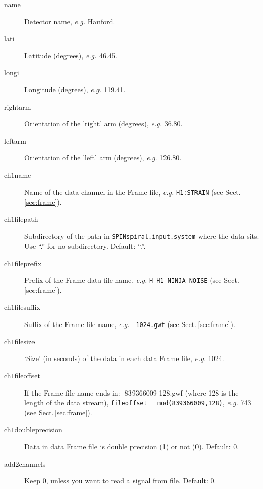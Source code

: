 \begin{description}
\item[name] Detector name, \textit{e.g.} Hanford.
\item[lati] Latitude (degrees), \textit{e.g.} 46.45.
\item[longi] Longitude (degrees), \textit{e.g.} 119.41.
\item[rightarm] Orientation of the 'right' arm (degrees), \textit{e.g.} 36.80.
\item[leftarm] Orientation of the 'left' arm (degrees), \textit{e.g.} 126.80.
                                                                                                                                                                                                               
\item[ch$1$name] Name of the data channel in the Frame file, \textit{e.g.} \texttt{H1:STRAIN} (see Sect.\,\ref{sec:frame}).
\item[ch$1$filepath] Subdirectory of the path in \texttt{SPINspiral.input.system} where the data sits.  Use ``.'' for no subdirectory.  Default: ``.''.
\item[ch$1$fileprefix] Prefix of the Frame data file name, \textit{e.g.} \texttt{H-H1\_NINJA\_NOISE} (see Sect.\,\ref{sec:frame}).
\item[ch$1$filesuffix] Suffix of the Frame file name, \textit{e.g.} \texttt{-1024.gwf} (see Sect.\,\ref{sec:frame}).
\item[ch$1$filesize] `Size' (in seconds) of the data in each data Frame file, \textit{e.g.} 1024.
\item[ch$1$fileoffset] If the Frame file name ends in: -839366009-128.gwf (where 128 is the length of the data stream), \texttt{fileoffset} = \texttt{mod(839366009,128)}, \textit{e.g.} 743 (see Sect.\,\ref{sec:frame}).
\item[ch$1$doubleprecision] Data in data Frame file is double precision (1) or not (0).  Default: 0.
\item[add2channels] Keep 0, unless you want to read a signal from file.  Default: 0.


\end{description}
